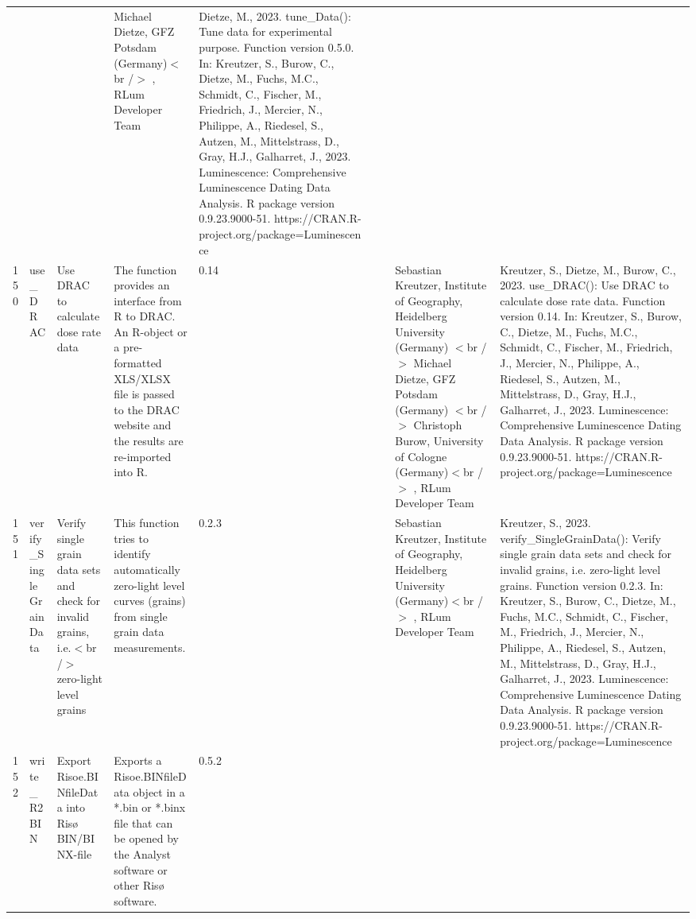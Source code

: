 \begin{table}[ht]
\begin{tabular}{rllllllll}
 &  &  & Michael Dietze, GFZ Potsdam (Germany)$<$br /$>$ , RLum Developer Team & Dietze, M., 2023. tune\_Data(): Tune data for experimental purpose. Function version 0.5.0. In: Kreutzer, S., Burow, C., Dietze, M., Fuchs, M.C., Schmidt, C., Fischer, M., Friedrich, J., Mercier, N., Philippe, A., Riedesel, S., Autzen, M., Mittelstrass, D., Gray, H.J., Galharret, J., 2023. Luminescence: Comprehensive Luminescence Dating Data Analysis. R package version 0.9.23.9000-51. https://CRAN.R-project.org/package=Luminescence
 \\ 
  150 & use\_DRAC & Use DRAC to calculate dose rate data & The function provides an interface from R to DRAC. An R-object or a pre-formatted XLS/XLSX file is passed to the DRAC website and the results are re-imported into R. & 0.14
 &  &  & Sebastian Kreutzer, Institute of Geography, Heidelberg University (Germany) $<$br /$>$ Michael Dietze, GFZ Potsdam (Germany) $<$br /$>$ Christoph Burow, University of Cologne (Germany)$<$br /$>$ , RLum Developer Team & Kreutzer, S., Dietze, M., Burow, C., 2023. use\_DRAC(): Use DRAC to calculate dose rate data. Function version 0.14. In: Kreutzer, S., Burow, C., Dietze, M., Fuchs, M.C., Schmidt, C., Fischer, M., Friedrich, J., Mercier, N., Philippe, A., Riedesel, S., Autzen, M., Mittelstrass, D., Gray, H.J., Galharret, J., 2023. Luminescence: Comprehensive Luminescence Dating Data Analysis. R package version 0.9.23.9000-51. https://CRAN.R-project.org/package=Luminescence
 \\ 
  151 & verify\_SingleGrainData & Verify single grain data sets and check for invalid grains, i.e.$<$br /$>$ zero-light level grains & This function tries to identify automatically zero-light level curves (grains) from single grain data measurements. & 0.2.3
 &  &  & Sebastian Kreutzer, Institute of Geography, Heidelberg University (Germany)$<$br /$>$ , RLum Developer Team & Kreutzer, S., 2023. verify\_SingleGrainData(): Verify single grain data sets and check for invalid grains, i.e. zero-light level grains. Function version 0.2.3. In: Kreutzer, S., Burow, C., Dietze, M., Fuchs, M.C., Schmidt, C., Fischer, M., Friedrich, J., Mercier, N., Philippe, A., Riedesel, S., Autzen, M., Mittelstrass, D., Gray, H.J., Galharret, J., 2023. Luminescence: Comprehensive Luminescence Dating Data Analysis. R package version 0.9.23.9000-51. https://CRAN.R-project.org/package=Luminescence
 \\ 
  152 & write\_R2BIN & Export Risoe.BINfileData into Risø BIN/BINX-file & Exports a  Risoe.BINfileData  object in a  *.bin  or  *.binx  file that can be opened by the Analyst software or other Risø software. & 0.5.2

\end{tabular}
\end{table}
